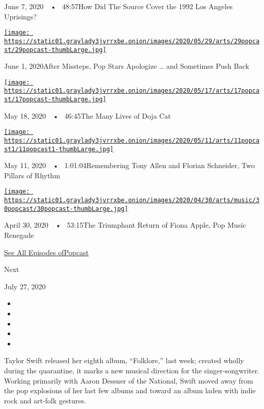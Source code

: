 June 7, 2020~~•~ 48:57How Did The Source Cover the 1992 Los Angeles
Uprisings?

\href{https://www.nytimes3xbfgragh.onion/2020/06/01/arts/music/popcast-lana-del-rey-doja-cat-apologies.html?action=click\&module=audio-series-bar\&region=header\&pgtype=Article}{\texttt{[image: https://static01.graylady3jvrrxbe.onion/images/2020/05/29/arts/29popcast/29popcast-thumbLarge.jpg]}}

June 1, 2020After Missteps, Pop Stars Apologize \ldots{} and Sometimes
Push Back

\href{https://www.nytimes3xbfgragh.onion/2020/05/18/arts/music/popcast-doja-cat.html?action=click\&module=audio-series-bar\&region=header\&pgtype=Article}{\texttt{[image: https://static01.graylady3jvrrxbe.onion/images/2020/05/17/arts/17popcast/17popcast-thumbLarge.jpg]}}

May 18, 2020~~•~ 46:45The Many Lives of Doja Cat

\href{https://www.nytimes3xbfgragh.onion/2020/05/11/arts/music/popcast-tony-allen-florian-schneider.html?action=click\&module=audio-series-bar\&region=header\&pgtype=Article}{\texttt{[image: https://static01.graylady3jvrrxbe.onion/images/2020/05/11/arts/11popcast1/11popcast1-thumbLarge.jpg]}}

May 11, 2020~~•~ 1:01:04Remembering Tony Allen and Florian Schneider,
Two Pillars of Rhythm

\href{https://www.nytimes3xbfgragh.onion/2020/04/30/arts/music/popcast-fiona-apple.html?action=click\&module=audio-series-bar\&region=header\&pgtype=Article}{\texttt{[image: https://static01.graylady3jvrrxbe.onion/images/2020/04/30/arts/music/30popcast/30popcast-thumbLarge.jpg]}}

April 30, 2020~~•~ 53:15The Triumphant Return of Fiona Apple, Pop Music
Renegade

\href{https://www.nytimes3xbfgragh.onion/column/popcast-pop-music-podcast}{See
All Episodes ofPopcast}

Next

July 27, 2020

\begin{itemize}
\item
\item
\item
\item
\item
\end{itemize}

Taylor Swift released her eighth album, ``Folklore,'' last week; created
wholly during the quarantine, it marks a new musical direction for the
singer-songwriter. Working primarily with Aaron Dessner of the National,
Swift moved away from the pop explosions of her last few albums and
toward an album laden with indie rock and art-folk gestures.


